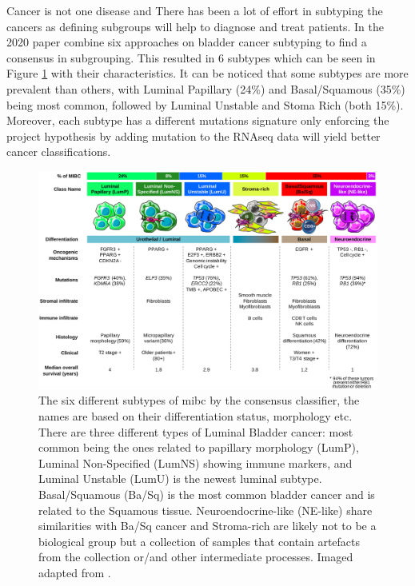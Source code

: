 Cancer is not one disease and There has been a lot of effort in subtyping the cancers as defining subgroups will help to diagnose and treat patients. In the 2020 paper \citet{Kamoun2020-tj} combine six approaches \cite{Mo2018-rl, Damrauer2014-tc, Choi2014-ed, Marzouka2018-ge, Rebouissou2014-ep,Robertson2017-mg} on bladder cancer subtyping to find a consensus in subgrouping. This resulted in 6 subtypes which can be seen in Figure \ref{fig:2020_consens} with their characteristics. It can be noticed that some subtypes are more prevalent than others, with Luminal Papillary (24\%) and Basal/Squamous (35\%) being most common, followed by Luminal Unstable and Stoma Rich (both 15\%). Moreover, each subtype has a different mutations signature only enforcing the project hypothesis by adding mutation to the RNAseq data will yield better cancer classifications.

\begin{figure}[!htb]                                  
    \centering\includegraphics[width=1.0\textwidth,height=1.0\textheight,keepaspectratio]{Images/TCGA/2020_consensus_subtypes.jpg}
      \caption{The six different subtypes of \acrfull{mibc} by the consensus classifier\cite{Kamoun2020-tj}, the names are based on their differentiation status, morphology etc. There are three different types of Luminal Bladder cancer: most common being the ones related to papillary morphology (LumP), Luminal Non-Specified (LumNS) showing immune markers, and Luminal Unstable (LumU) is the newest luminal subtype. Basal/Squamous (Ba/Sq) is the most common bladder cancer and is related to the Squamous tissue. Neuroendocrine-like (NE-like) share similarities with Ba/Sq cancer and Stroma-rich are likely not to be a biological group but a collection of samples that contain artefacts from the collection or/and other intermediate processes. Imaged adapted from \cite{Kamoun2020-tj}.
      }
      \label{fig:2020_consens}
  \end{figure}
  \FloatBarrier

